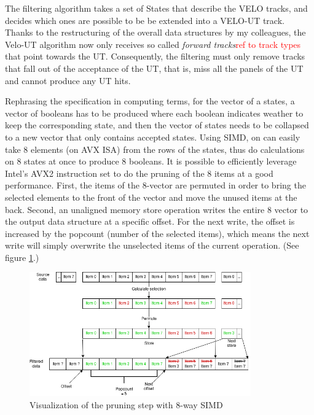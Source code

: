 \documentclass[12pt]{article}
\begin{document}
The filtering algorithm takes a set of States that describe the VELO tracks, and decides which ones are possible to be be extended into a VELO-UT track. Thanks to the restructuring of the overall data structures by my colleagues, the Velo-UT algorithm now only receives so called \textit{forward tracks}\textcolor{red}{ref to track types} that point towards the UT. Consequently, the filtering must only remove tracks that fall out of the acceptance of the UT, that is, miss all the panels of the UT and cannot produce any UT hits.

Rephrasing the specification in computing terms, for the vector of a states, a vector of booleans has to be produced where each boolean indicates weather to keep the corresponding state, and then the vector of states needs to be collapsed to a new vector that only contains accepted states. Using SIMD, on can easily take 8 elements (on AVX ISA) from the rows of the states, thus do calculations on 8 states at once to produce 8 booleans. It is possible to efficiently leverage Intel's AVX2 instruction set to do the pruning of the 8 items at a good performance\cite{lemire_simd_prune}. First, the items of the 8-vector are permuted in order to bring the selected elements to the front of the vector and move the unused items at the back. Second, an unaligned memory store operation writes the entire 8 vector to the output data structure at a specific offset. For the next write, the offset is increased by the popcount (number of the selected items), which means the next write will simply overwrite the unselected items of the current operation. (See figure \ref{fig_velout_opt_simd_filter}.)

\begin{figure}[H]
	\begin{center}
		\includegraphics[width=0.85\textwidth]{velout_opt_simd_filter}
	\end{center}
	\caption{Visualization of the pruning step with 8-way SIMD}
	\label{fig_velout_opt_simd_filter}
\end{figure}
\end{document}
